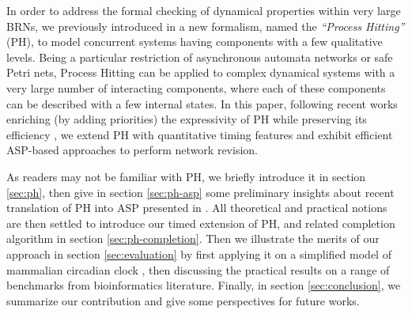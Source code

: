 In order to address the formal checking of dynamical properties within very large BRNs, we previously introduced in \cite{PMR10-TCSB} a new formalism, named the \emph{``Process Hitting''} (PH), to model concurrent systems having components with a few qualitative levels. Being a particular restriction of asynchronous automata networks or safe Petri nets, Process Hitting can be applied to complex dynamical systems with a very large number of interacting components, where each of these components can be described with a few internal states. In this paper, following recent works enriching (by adding priorities) the expressivity of PH while preserving its efficiency \cite{folschette2013under}, we extend PH with quantitative timing features and exhibit efficient ASP-based approaches to perform network revision. 

As readers may not be familiar with PH, we briefly introduce it in section \ref{sec:ph}, then give in section \ref{sec:ph-asp} some preliminary insights about recent translation of PH into ASP presented in \cite{benabdallah2015}. All theoretical and practical notions are then settled to introduce our timed extension of PH, and related completion algorithm in section \ref{sec:ph-completion}. Then we illustrate the merits of our approach in section \ref{sec:evaluation} by first applying it on a simplified model of mammalian circadian clock \cite{comet2012simplified}, then discussing the practical results on a range of benchmarks from bioinformatics literature. Finally, in section \ref{sec:conclusion}, we summarize our contribution and give some perspectives for future works. 



